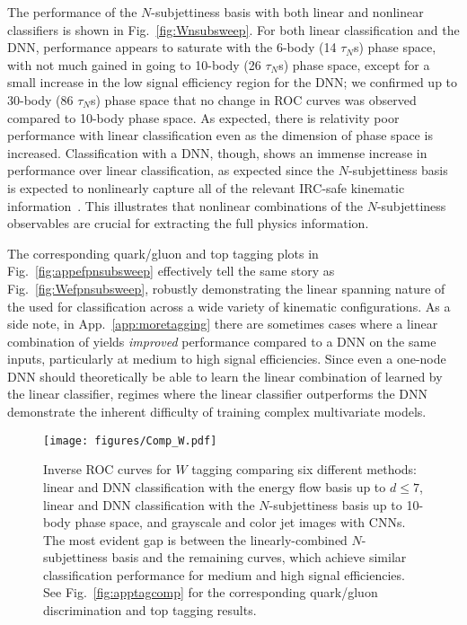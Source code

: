 \documentclass[letterpaper,11pt]{article}
\DeclareRobustCommand{\App}[1]{App.~\ref{#1}}
\DeclareRobustCommand{\Fig}[1]{Fig.~\ref{#1}}
\newcommand{\Bs}{\text{EFPs}\xspace}
\begin{document}
The performance of the $N$-subjettiness basis with both linear and nonlinear classifiers is shown in \Fig{fig:Wnsubsweep}.
%
For both linear classification and the DNN, performance appears to saturate with the 6-body (14 $\tau_N$s) phase space, with not much gained in going to 10-body (26 $\tau_N$s) phase space, except for a small increase in the low signal efficiency region for the DNN; we confirmed up to 30-body (86 $\tau_N$s) phase space that no change in ROC curves was observed compared to 10-body phase space.
%
As expected, there is relativity poor performance with linear classification even as the dimension of phase space is increased.
%
Classification with a DNN, though, shows an immense increase in performance over linear classification, as expected since the $N$-subjettiness basis is expected to nonlinearly capture all of the relevant IRC-safe kinematic information~\cite{Datta:2017rhs}.
%
This illustrates that nonlinear combinations of the $N$-subjettiness observables are crucial for extracting the full physics information.

The corresponding quark/gluon and top tagging plots in \Fig{fig:appefpnsubsweep} effectively tell the same story as \Fig{fig:Wefpnsubsweep}, robustly demonstrating the linear spanning nature of the \Bs used for classification across a wide variety of kinematic configurations.
%
As a side note, in \App{app:moretagging} there are sometimes cases where a linear combination of \Bs yields \emph{improved} performance compared to a DNN on the same inputs, particularly at medium to high signal efficiencies.
%
Since even a one-node DNN should theoretically be able to learn the linear combination of \Bs learned by the linear classifier, regimes where the linear classifier outperforms the DNN demonstrate the inherent difficulty of training complex multivariate models.

\begin{figure}[t]
\centering
\texttt{[image: figures/Comp\_W.pdf]}
\caption{Inverse ROC curves for $W$ tagging comparing six different methods:  linear and DNN classification with the energy flow basis up to $d\le 7$, linear and DNN classification with the $N$-subjettiness basis up to 10-body phase space, and grayscale and color jet images with CNNs. The most evident gap is between the linearly-combined $N$-subjettiness basis and the remaining curves, which achieve similar classification performance for medium and high signal efficiencies. See \Fig{fig:apptagcomp} for the corresponding quark/gluon discrimination and top tagging results.}
\label{fig:Wtagcomp}
\end{figure}
\end{document}
